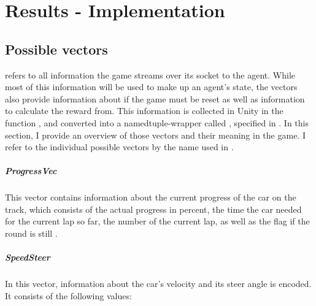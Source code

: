 \chapter{Results - Implementation}

\label{ch:implementationresults}


\section{Possible vectors}

\label{ch:thevectors}


 refers to all information the game streams over its socket to the agent. While most of this information will be used to make up an agent's state, the vectors also provide information about if the game must be reset as well as information to calculate the reward from. This information is collected in Unity in the function , and converted into a namedtuple-wrapper called , specified in . In this section, I provide an overview of those vectors and their meaning in the game. I refer to the individual possible vectors by the name used in .

\paragraph{ProgressVec} This vector contains information about the current progress of the car on the track, which consists of the actual progress in percent, the time the car needed for the current lap so far, the number of the current lap, as well as the flag if the round is still .

\paragraph{SpeedSteer} In this vector, information about the car's velocity and its steer angle is encoded. It consists of the following values:

